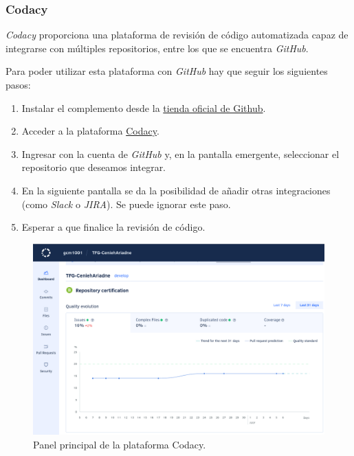 \documentclass[
]{article}
\providecommand{\tightlist}{%
  \setlength{\itemsep}{0pt}\setlength{\parskip}{0pt}}
\begin{document}
\hypertarget{codacy}{%
\subsubsection{Codacy}\label{codacy}}

\emph{Codacy} proporciona una plataforma de revisión de código
automatizada capaz de integrarse con múltiples repositorios, entre los
que se encuentra \emph{GitHub}.

Para poder utilizar esta plataforma con \emph{GitHub} hay que seguir los
siguientes pasos:

\begin{enumerate}
\def\labelenumi{\arabic{enumi}.}
\tightlist
\item
  Instalar el complemento desde la
  \href{https://github.com/marketplace/codacy}{tienda oficial de
  Github}.
\item
  Acceder a la plataforma \href{https://codacy.com}{Codacy}.
\item
  Ingresar con la cuenta de \emph{GitHub} y, en la pantalla emergente,
  seleccionar el repositorio que deseamos integrar.
\item
  En la siguiente pantalla se da la posibilidad de añadir otras
  integraciones (como \emph{Slack} o \emph{JIRA}). Se puede ignorar este
  paso.
\item
  Esperar a que finalice la revisión de código.
\end{enumerate}

\begin{figure}
\hypertarget{codacy}{%
\centering
\includegraphics{../_static/images/codacy.png}
\caption{Panel principal de la plataforma Codacy.}\label{codacy}
}
\end{figure}
\end{document}

